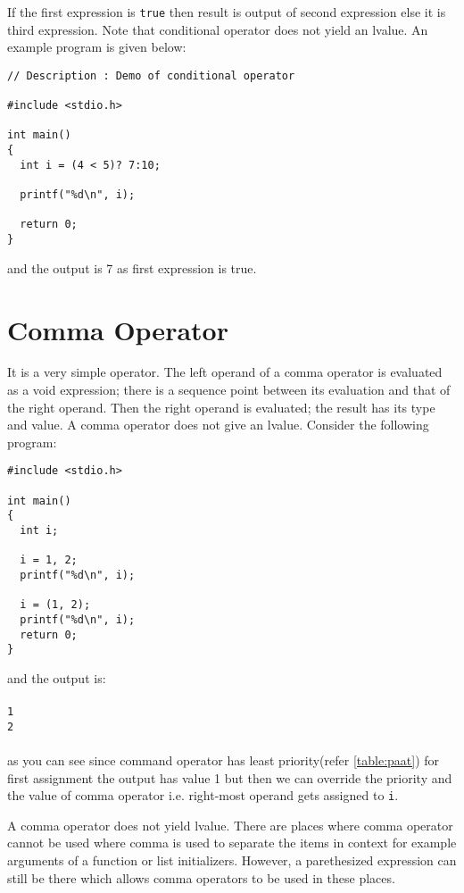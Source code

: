 If the first expression is \texttt{true} then result is output of second
expression else it is third expression. Note that conditional operator does not
yield an lvalue. An example program is given below:

\begin{verbatim}
// Description : Demo of conditional operator

#include <stdio.h>

int main()
{
  int i = (4 < 5)? 7:10;

  printf("%d\n", i);

  return 0;
}
\end{verbatim}
and the output is 7 as first expression is true.

\section{Comma Operator}
It is a very simple operator. The left operand of a comma operator is evaluated
as a void expression; there is a sequence point between its evaluation and that
of the right operand. Then the right operand is evaluated; the result has its
type and value. A comma operator does not give an lvalue. Consider the
following program:

\begin{verbatim}
#include <stdio.h>

int main()
{
  int i;

  i = 1, 2;
  printf("%d\n", i);

  i = (1, 2);
  printf("%d\n", i);
  return 0;
}
\end{verbatim}

and the output is:
\\\\\texttt{1\\
2\\\\}
as you can see since command operator has least priority(refer
\ref{table:paat}) for first assignment the output has value 1 but then we can
override the priority and the value of comma operator i.e. right-most operand
gets assigned to \texttt{i}.

A comma operator does not yield lvalue. There are places where comma operator
cannot be used where comma is used to separate the items in context for example
arguments of a function or list initializers. However, a parethesized
expression can still be there which allows comma operators to be used in these
places.

